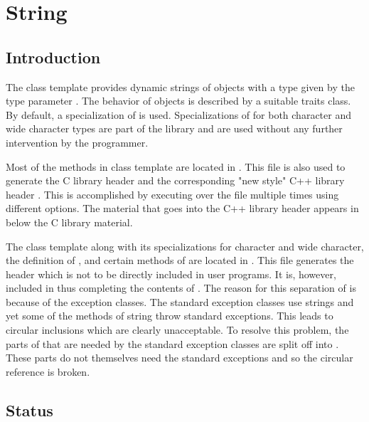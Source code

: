 
\chapter{String}

\section{Introduction}

The class template  provides dynamic strings of objects with
a type given by the type parameter . The behavior of 
objects is described by a suitable traits class. By default, a specialization
of  is used. Specializations of
 for both character and wide character types are part
of the library and are used without any further intervention by the
programmer.

Most of the methods in class template  are located in
. This file is also used to generate the C
library header  and the corresponding "new style" C++
library header . This is accomplished by executing
 over the file multiple times using different options. The
material that goes into the C++ library header  appears in
 below the C library material.

The class template  along with its specializations for
character and wide character, the definition of , and
certain methods of  are located in
. This file generates the header
 which is not to be directly included in user programs. It
is, however, included in  thus completing the contents of
. The reason for this separation of  is
because of the exception classes. The standard exception classes use strings
and yet some of the methods of string throw standard exceptions. This leads to
circular inclusions which are clearly unacceptable. To resolve this problem,
the parts of  that are needed by the standard exception
classes are split off into . These parts do not themselves
need the standard exceptions and so the circular reference is broken.

\section{Status}

